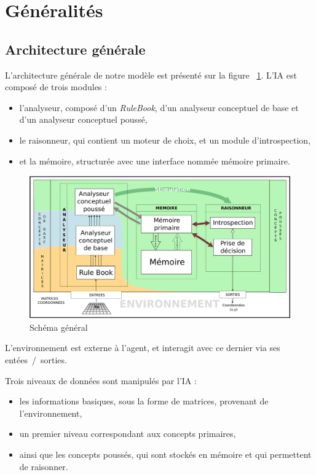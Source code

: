 \section{Généralités}

\subsection{Architecture générale}
\label{subsection_architecture_generale}
L'architecture générale de notre modèle est présenté sur la figure ~\ref{schema_general}. L'IA est composé de trois modules :
\begin{itemize}
\item l'analyseur, composé d'un \emph{RuleBook}, d'un analyseur conceptuel de base et d'un analyseur conceptuel poussé,
\item le raisonneur, qui contient un moteur de choix, et un module d'introspection,
\item et la mémoire, structurée avec une interface nommée mémoire primaire.
\end{itemize}

\begin{figure}[H] 
\includegraphics[width=\textwidth]{files/simplified_general_diagram} 
\caption{Schéma général} 
\label{schema_general}
\end{figure}

L'environnement est externe à l'agent, et interagit avec ce dernier via ses entées~/~sorties.

Trois niveaux de données sont manipulés par l'IA :
\begin{itemize}
\item les informations basiques, sous la forme de matrices, provenant de l'environnement,
\item un premier niveau correspondant aux concepts primaires,
\item ainsi que les concepts poussés, qui sont stockés en mémoire et qui permettent de raisonner.
\end{itemize}

